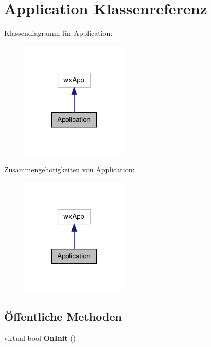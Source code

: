 \hypertarget{classApplication}{\section{Application Klassenreferenz}
\label{classApplication}
}


Klassendiagramm für Application\-:\nopagebreak
\begin{figure}[H]
\begin{center}
\leavevmode
\includegraphics[width=144pt]{classApplication__inherit__graph}
\end{center}
\end{figure}


Zusammengehörigkeiten von Application\-:\nopagebreak
\begin{figure}[H]
\begin{center}
\leavevmode
\includegraphics[width=144pt]{classApplication__coll__graph}
\end{center}
\end{figure}
\subsection*{Öffentliche Methoden}
\begin{DoxyCompactItemize}
\item 
\hypertarget{classApplication_aa6b97a4bf380f56a925910b4223016c5}{virtual bool {\bfseries On\-Init} ()}\label{classApplication_aa6b97a4bf380f56a925910b4223016c5}

\end{DoxyCompactItemize}


